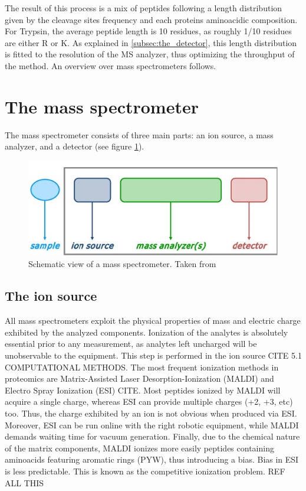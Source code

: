 \documentclass[11pt, a4paper]{report}
\begin{document}
The result of this process is a mix of peptides following a length distribution given by the cleavage sites frequency and each protein\textquotesingle s aminoacidic composition. For Trypsin, the average peptide length is 10 residues, as roughly 1/10 residues are either R or K.
As explained in \ref{subsec:the_detector}, this length distribution is fitted to the resolution of the MS analyzer, thus optimizing the throughput of the method. An overview over mass spectrometers follows.

\section{The mass spectrometer}
\label{sec:the_mass_spectrometer}

The mass spectrometer consists of three main parts: an ion source, a mass analyzer, and a detector (see figure \ref{fig:mass_spectrometer}).

\begin{figure}[!h]
\includegraphics[width=\textwidth]{mass_spectrometer}
\caption{Schematic view of a mass spectrometer. Taken from}
\label{fig:mass_spectrometer}
\end{figure}

\subsection{The ion source}
\label{subsec:the_ion_source}

All mass spectrometers exploit the physical properties of mass and electric charge exhibited by the analyzed components. Ionization of the analytes is absolutely essential prior to any measurement, as analytes left uncharged will be unobservable to the equipment.
This step is performed in the ion source CITE 5.1 COMPUTATIONAL METHODS. The most frequent ionization methods in proteomics are Matrix-Assisted Laser Desorption-Ionization (MALDI) and Electro Spray Ionization (ESI) CITE. Most peptides ionized by MALDI will acquire a single charge, whereas ESI can provide multiple charges (+2, +3, etc) too. Thus, the charge exhibited by an ion is not obvious when produced via ESI. Moreover, ESI can be run online with the right robotic equipment, while MALDI demands waiting time for vacuum generation. Finally, due to the chemical nature of the matrix components, MALDI ionizes more easily peptides containing aminoacids featuring aromatic rings (PYW), thus introducing a bias. Bias in ESI is less predictable. This is known as the competitive ionization problem. REF ALL THIS
\end{document}
